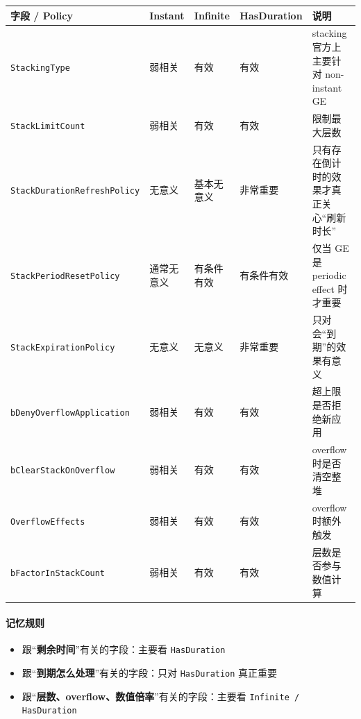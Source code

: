 \documentclass[CJKmath=true,10pt]{MyBook}
\begin{document}
\begin{longtable}{@{}p{}p{}p{}p{}p{}@{}}
	\toprule
	\textbf{字段 / Policy} & \textbf{Instant} & \textbf{Infinite} & \textbf{HasDuration} & \textbf{说明} \\
	\midrule
	\endhead
	
	\texttt{StackingType}
	& 弱相关
	& 有效
	& 有效
	& stacking 官方上主要针对 non-instant GE
	\\
	
	\texttt{StackLimitCount}
	& 弱相关
	& 有效
	& 有效
	& 限制最大层数
	\\
	
	\texttt{StackDurationRefreshPolicy}
	& 无意义
	& 基本无意义
	& 非常重要
	& 只有存在倒计时的效果才真正关心“刷新时长”
	\\
	
	\texttt{StackPeriodResetPolicy}
	& 通常无意义
	& 有条件有效
	& 有条件有效
	& 仅当 GE 是 periodic effect 时才重要
	\\
	
	\texttt{StackExpirationPolicy}
	& 无意义
	& 无意义
	& 非常重要
	& 只对会“到期”的效果有意义
	\\
	
	\texttt{bDenyOverflowApplication}
	& 弱相关
	& 有效
	& 有效
	& 超上限是否拒绝新应用
	\\
	
	\texttt{bClearStackOnOverflow}
	& 弱相关
	& 有效
	& 有效
	& overflow 时是否清空整堆
	\\
	
	\texttt{OverflowEffects}
	& 弱相关
	& 有效
	& 有效
	& overflow 时额外触发
	\\
	
	\texttt{bFactorInStackCount}
	& 弱相关
	& 有效
	& 有效
	& 层数是否参与数值计算
	\\
	
	\bottomrule
\end{longtable}

\paragraph{记忆规则}
\begin{itemize}
	\item 跟“\textbf{剩余时间}”有关的字段：主要看 \texttt{HasDuration}
	\item 跟“\textbf{到期怎么处理}”有关的字段：只对 \texttt{HasDuration} 真正重要
	\item 跟“\textbf{层数、overflow、数值倍率}”有关的字段：主要看 \texttt{Infinite / HasDuration}
\end{itemize}
\end{document}
